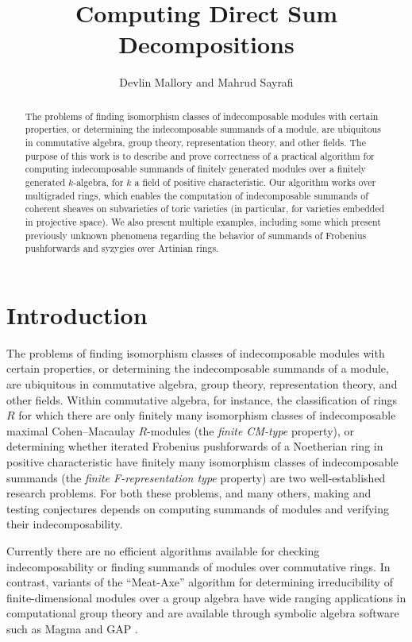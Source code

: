 \documentclass[12pt]{article}
\title{Computing Direct Sum Decompositions}
\author{Devlin Mallory and Mahrud Sayrafi}
\numberwithin{equation}{section}
\theoremstyle{theorem}
\numberwithin{thm}{section}
\theoremstyle{definition}
\begin{document}
\maketitle

\begin{abstract}
  The problems of finding isomorphism classes of indecomposable modules with certain properties, or determining the indecomposable summands of a module, are ubiquitous in commutative algebra, group theory, representation theory, and other fields. The purpose of this work is to describe and prove correctness of a practical algorithm for computing indecomposable summands of finitely generated modules over a finitely generated $k$-algebra, for $k$ a field of positive characteristic. Our algorithm works over multigraded rings, which enables the computation of indecomposable summands of coherent sheaves on subvarieties of toric varieties (in particular, for varieties embedded in projective space). We also present multiple examples, including some which present previously unknown phenomena regarding the behavior of summands of Frobenius pushforwards and syzygies over Artinian rings.
\end{abstract}



\section{Introduction}

The problems of finding isomorphism classes of indecomposable modules with certain properties, or determining the indecomposable summands of a module, are ubiquitous in commutative algebra, group theory, representation theory, and other fields. Within commutative algebra, for instance, the classification of rings $R$ for which there are only finitely many isomorphism classes of indecomposable maximal Cohen--Macaulay $R$-modules (the \emph{finite CM-type} property), or determining whether iterated Frobenius pushforwards of a Noetherian ring in positive characteristic have finitely many isomorphism classes of indecomposable summands (the \emph{finite F-representation type} property) are two well-established research problems. For both these problems, and many others, making and testing conjectures depends on computing summands of modules and verifying their indecomposability.

Currently there are no efficient algorithms available for checking indecomposability or finding summands of modules over commutative rings. In contrast, variants of the ``Meat-Axe'' algorithm for determining irreducibility of finite-dimensional modules over a group algebra have wide ranging applications in computational group theory \cite{Parker84,HR94,Holt98} and are available through symbolic algebra software such as Magma and GAP \cite{MAGMA,GAP}.
\end{document}
